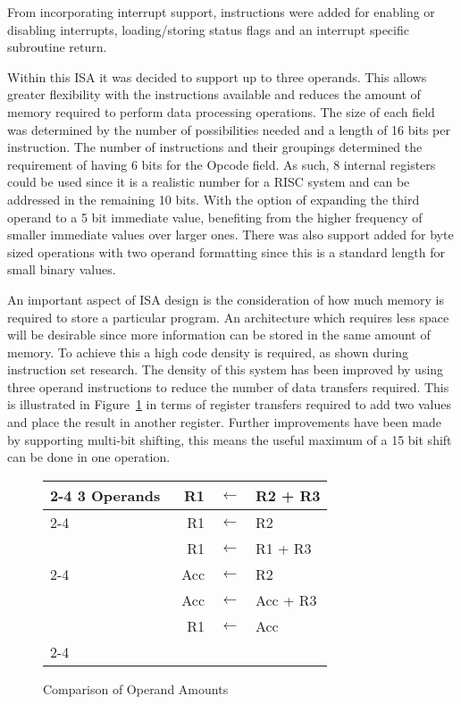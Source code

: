 From incorporating interrupt support, instructions were added for enabling or disabling interrupts, loading/storing status flags and an interrupt specific subroutine return.


Within this ISA it was decided to support up to three operands. 
This allows greater flexibility with the instructions available and reduces the amount of memory required to perform data processing operations. 
The size of each field was determined by the number of possibilities needed and a length of 16 bits per instruction.
The number of instructions and their groupings determined the requirement of having 6 bits for the Opcode field. 
As such, 8 internal registers could be used since it is a realistic number for a RISC system and can be addressed in the remaining 10 bits. 
With the option of expanding the third operand to a 5 bit immediate value, benefiting from the higher frequency of smaller immediate values over larger ones. 
There was also support added for byte sized operations with two operand formatting since this is a standard length for small binary values. 

An important aspect of ISA design is the consideration of how much memory is required to store a particular program. 
An architecture which requires less space will be desirable since more information can be stored in the same amount of memory. 
To achieve this a high code density is required, as shown during instruction set research.
The density of this system has been improved by using three operand instructions to reduce the number of data transfers required. 
This is illustrated in Figure~\ref{fig:NoOperands} in terms of register transfers required to add two values and place the result in another register. 
Further improvements have been made by supporting multi-bit shifting, this means the useful maximum of a 15 bit shift can be done in one operation.

\begin{figure}[h]
\setlength{\tabcolsep}{2pt}
\centering
\footnotesize
\begin{tabular}{l|rcl|}
	\cline{2-4}
	3 Operands & R1 & $\leftarrow$ & R2 + R3 \\
	\cline{2-4}
	\multirow{2}{*}{2 Operands} & R1 & $\leftarrow$ & R2 \\
	 & R1 & $\leftarrow$ & R1 + R3 \\
	\cline{2-4}
	\multirow{3}{*}{1 Operand} & Acc & $\leftarrow$ & R2 \\
	 & ~Acc & $\leftarrow$ & Acc + R3 \hspace{0.5cm} \\
	 & R1 & $\leftarrow$ & Acc \\
	\cline{2-4}
\end{tabular}
\caption{Comparison of Operand Amounts}
\label{fig:NoOperands}
\end{figure}

